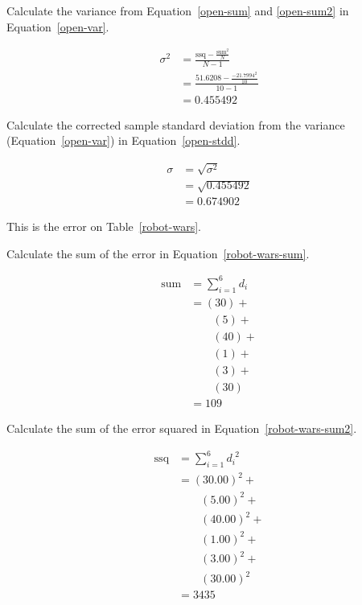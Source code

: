 \documentclass[twocolumn]{article}
\begin{document}
Calculate the variance from Equation~\ref{open-sum} and \ref{open-sum2} in Equation~\ref{open-var}.

\begin{align}
\sigma^{2} &= \frac{\text{ssq} - \frac{\text{sum}^{2}}{N}}{N-1} \nonumber\\
 &= \frac{51.6208 - \frac{-21.7994^2}{10}}{10-1} \nonumber\\
 &= 0.455492 \label{open-var}
\end{align}

Calculate the corrected sample standard deviation from the variance (Equation~\ref{open-var}) in Equation~\ref{open-stdd}.

\begin{align}
\sigma &= \sqrt{\sigma^{2}} \nonumber\\
 &= \sqrt{0.455492} \nonumber\\
 &= 0.674902 \label{open-stdd}
\end{align}






This is the error on Table~\ref{robot-wars}.

Calculate the sum of the error in Equation~\ref{robot-wars-sum}.

\begin{align}
\text{sum} &= \sum_{i=1}^{6} d_{i} \nonumber\\
 &= (30) + \nonumber\\
 &\quad\quad (5) + \nonumber\\
 &\quad\quad (40) + \nonumber\\
 &\quad\quad (1) + \nonumber\\
 &\quad\quad (3) + \nonumber\\
 &\quad\quad (30) \nonumber\\
 &= 109 \label{robot-wars-sum}
\end{align}

Calculate the sum of the error squared in Equation~\ref{robot-wars-sum2}.

\begin{align}
\text{ssq} &= \sum_{i=1}^{6} d_{i}^{\phantom{i}2} \nonumber\\
 &= (30.00)^2 + \nonumber\\
 &\quad\quad (5.00)^2 + \nonumber\\
 &\quad\quad (40.00)^2 + \nonumber\\
 &\quad\quad (1.00)^2 + \nonumber\\
 &\quad\quad (3.00)^2 + \nonumber\\
 &\quad\quad (30.00)^2 \nonumber\\
 &= 3435 \label{robot-wars-sum2}
\end{align}
\end{document}
